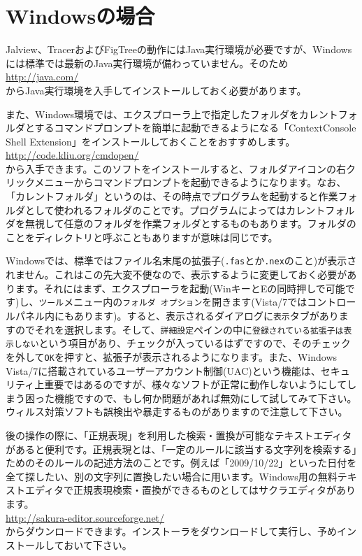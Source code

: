 \documentclass[titlepage,10pt,a4paper]{jsbook}
\begin{document}
\section{Windowsの場合}

Jalview、TracerおよびFigTreeの動作にはJava実行環境が必要ですが、Windowsには標準では最新のJava実行環境が備わっていません。そのため\\
\href{http://java.com/}{http://java.com/}\\
からJava実行環境を入手してインストールしておく必要があります。

また、Windows環境では、エクスプローラ上で指定したフォルダをカレントフォルダとするコマンドプロンプトを簡単に起動できるようになる「ContextConsole Shell Extension」をインストールしておくことをおすすめします。\\
\href{http://code.kliu.org/cmdopen/}{http://code.kliu.org/cmdopen/}\\
から入手できます。このソフトをインストールすると、フォルダアイコンの右クリックメニューからコマンドプロンプトを起動できるようになります。なお、「カレントフォルダ」というのは、その時点でプログラムを起動すると作業フォルダとして使われるフォルダのことです。プログラムによってはカレントフォルダを無視して任意のフォルダを作業フォルダとするものもあります。フォルダのことをディレクトリと呼ぶこともありますが意味は同じです。

Windowsでは、標準ではファイル名末尾の拡張子(\texttt{.fas}とか\texttt{.nex}のこと)が表示されません。これはこの先大変不便なので、表示するように変更しておく必要があります。それにはまず、エクスプローラを起動(WinキーとEの同時押しで可能です)し、\texttt{ツール}メニュー内の\texttt{フォルダ オプション}を開きます(Vista/7ではコントロールパネル内にもあります)。すると、表示されるダイアログに\texttt{表示}タブがありますのでそれを選択します。そして、\texttt{詳細設定}ペインの中に\texttt{登録されている拡張子は表示しない}という項目があり、チェックが入っているはずですので、そのチェックを外して\texttt{OK}を押すと、拡張子が表示されるようになります。また、Windows Vista/7に搭載されているユーザーアカウント制御(UAC)という機能は、セキュリティ上重要ではあるのですが、様々なソフトが正常に動作しないようにしてしまう困った機能ですので、もし何か問題があれば無効にして試してみて下さい。ウィルス対策ソフトも誤検出や暴走するものがありますので注意して下さい。

後の操作の際に、「正規表現」を利用した検索・置換が可能なテキストエディタがあると便利です。正規表現とは、「一定のルールに該当する文字列を検索する」ためのそのルールの記述方法のことです。例えば「2009/10/22」といった日付を全て探したい、別の文字列に置換したい場合に用います。Windows用の無料テキストエディタで正規表現検索・置換ができるものとしてはサクラエディタがあります。\\
\href{http://sakura-editor.sourceforge.net/}{http://sakura-editor.sourceforge.net/}\\
からダウンロードできます。インストーラをダウンロードして実行し、予めインストールしておいて下さい。
\end{document}
